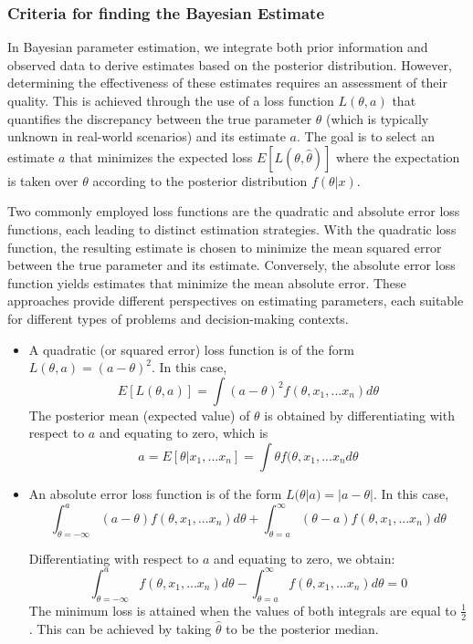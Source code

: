\documentclass[12pt]{article}
\begin{document}
		\subsubsection{Criteria for finding the Bayesian Estimate}
		
		In Bayesian parameter estimation, we integrate both prior information and observed data to derive estimates based on the posterior distribution. However, determining the effectiveness of these estimates requires an assessment of their quality. This is achieved through the use of a loss function $L(\theta,a)$ that quantifies the discrepancy between the true parameter $\theta$ (which is typically unknown in real-world scenarios) and its estimate $a$. The goal is to select an estimate $a$ that minimizes the expected loss $E[L(\theta,\hat{\theta})]$ where the expectation is taken over $\theta$ according to the posterior distribution $f(\theta|x)$. 
		
		Two commonly employed loss functions are the quadratic and absolute error loss functions, each leading to distinct estimation strategies. With the quadratic loss function, the resulting estimate is chosen to minimize the mean squared error between the true parameter and its estimate. Conversely, the absolute error loss function yields estimates that minimize the mean absolute error. These approaches provide different perspectives on estimating parameters, each suitable for different types of problems and decision-making contexts.
		
		\begin{itemize}
			\item A quadratic (or squared error) loss function is of the form $L(\theta,a) = (a - \theta)^{2}$. In this case, 
			$$E[L(\theta,a)] = \int (a - \theta)^{2}f(\theta,x_{1},...x_{n}) d\theta$$
			The posterior mean (expected value) of $\theta$ is obtained by differentiating with respect to $a$ and equating to zero, which is
			$$a = E[\theta|x_{1},...x_{n}] = \int \theta f(\theta,x_{1},...x_{n}d\theta$$
			
			\item An absolute error loss function is of the form $L(\theta|a) = |a - \theta|$. In this case,
			$$\int_{\theta = -\infty}^{a} (a - \theta)f(\theta,x_{1},...x_{n}) d\theta + \int_{\theta = a}^{\infty} (\theta - a)f(\theta,x_{1},...x_{n}) d\theta$$
			
			Differentiating with respect to $a$ and equating to zero, we obtain:
			$$\int_{\theta = -\infty}^{a} f(\theta,x_{1},...x_{n}) d\theta - \int_{\theta = a}^{\infty} f(\theta,x_{1},...x_{n}) d\theta = 0$$
			The minimum loss is attained when the values of both integrals are equal to $\frac{1}{2}$. This can be achieved by taking $\hat{\theta}$ to be the posterior median. 
			
			\end{itemize}
			
\end{document}
